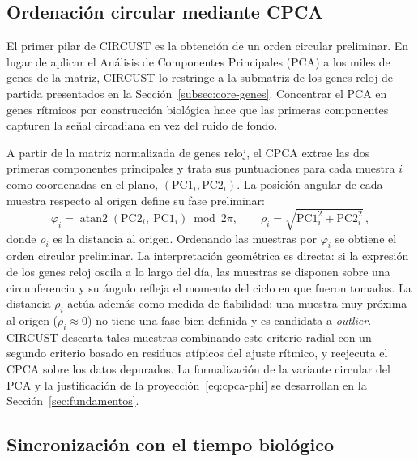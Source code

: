\documentclass[12pt, a4paper]{report}
\begin{document}
\subsection{Ordenación circular mediante CPCA}
\label{subsec:cpca-intro}

El primer pilar de CIRCUST es la obtención de un orden circular preliminar. En lugar de aplicar el Análisis de Componentes Principales (PCA) a los miles de genes de la matriz, CIRCUST lo restringe a la submatriz de los genes reloj de partida presentados en la Sección~\ref{subsec:core-genes}. Concentrar el PCA en genes rítmicos por construcción biológica hace que las primeras componentes capturen la señal circadiana en vez del ruido de fondo.

A partir de la matriz normalizada de genes reloj, el CPCA extrae las dos primeras componentes principales y trata sus puntuaciones para cada muestra $i$ como coordenadas en el plano, $(\text{PC1}_i, \text{PC2}_i)$. La posición angular de cada muestra respecto al origen define su fase preliminar:
\begin{equation}
    \varphi_i = \operatorname{atan2}(\text{PC2}_i,\ \text{PC1}_i) \bmod 2\pi,
    \qquad
    \rho_i = \sqrt{\text{PC1}_i^{2} + \text{PC2}_i^{2}}\,,
    \label{eq:cpca-phi}
\end{equation}
donde $\rho_i$ es la distancia al origen. Ordenando las muestras por $\varphi_i$ se obtiene el orden circular preliminar. La interpretación geométrica es directa: si la expresión de los genes reloj oscila a lo largo del día, las muestras se disponen sobre una circunferencia y su ángulo refleja el momento del ciclo en que fueron tomadas. La distancia $\rho_i$ actúa además como medida de fiabilidad: una muestra muy próxima al origen ($\rho_i\approx 0$) no tiene una fase bien definida y es candidata a \textit{outlier}. CIRCUST descarta tales muestras combinando este criterio radial con un segundo criterio basado en residuos atípicos del ajuste rítmico, y reejecuta el CPCA sobre los datos depurados. La formalización de la variante circular del PCA y la justificación de la proyección~\eqref{eq:cpca-phi} se desarrollan en la Sección~\ref{sec:fundamentos}.

\subsection{Sincronización con el tiempo biológico}
\label{subsec:sync-intro}
\end{document}
